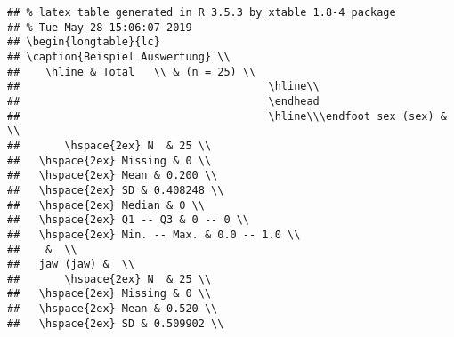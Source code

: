 \documentclass{article}\usepackage[]{graphicx}\usepackage[]{color}
\makeatletter
\newenvironment{kframe}{%
 \def\at@end@of@kframe{}%
 \ifinner\ifhmode%
  \def\at@end@of@kframe{\end{minipage}}%
  \begin{minipage}{\columnwidth}%
 \fi\fi%
 \def\FrameCommand##1{\hskip\@totalleftmargin \hskip-\fboxsep
 \colorbox{shadecolor}{##1}\hskip-\fboxsep
     \hskip-\linewidth \hskip-\@totalleftmargin \hskip\columnwidth}%
 \MakeFramed {\advance\hsize-\width
   \@totalleftmargin\z@ \linewidth\hsize
   \@setminipage}}%
 {\par\unskip\endMakeFramed%
 \at@end@of@kframe}
\newenvironment{knitrout}{}{} %
\makeatother
\begin{document}

\begin{knitrout}
\color{fgcolor}\begin{kframe}


{\ttfamily\noindent{}}\begin{verbatim}
## % latex table generated in R 3.5.3 by xtable 1.8-4 package
## % Tue May 28 15:06:07 2019
## \begin{longtable}{lc}
## \caption{Beispiel Auswertung} \\ 
##    \hline & Total   \\ & (n = 25) \\
##                                       \hline\\
##                                       \endhead
##                                       \hline\\\endfoot sex (sex) &  \\ 
##       \hspace{2ex} N  & 25 \\ 
##   \hspace{2ex} Missing & 0 \\ 
##   \hspace{2ex} Mean & 0.200 \\ 
##   \hspace{2ex} SD & 0.408248 \\ 
##   \hspace{2ex} Median & 0 \\ 
##   \hspace{2ex} Q1 -- Q3 & 0 -- 0 \\ 
##   \hspace{2ex} Min. -- Max. & 0.0 -- 1.0 \\ 
##    &  \\ 
##   jaw (jaw) &  \\ 
##       \hspace{2ex} N  & 25 \\ 
##   \hspace{2ex} Missing & 0 \\ 
##   \hspace{2ex} Mean & 0.520 \\ 
##   \hspace{2ex} SD & 0.509902 \\ 

\end{verbatim}
\end{kframe}
\end{knitrout}
\end{document}
